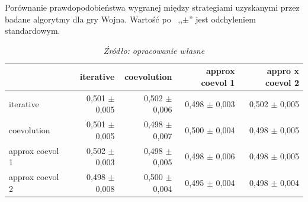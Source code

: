 \documentclass[inzynierska]{pwr_wmat_praca_dyplomowa}
\theoremstyle{plain}
\numberwithin{theorem}{chapter}
\theoremstyle{definition}
\numberwithin{theorem}{chapter}
\begin{document}
	\begin{table}
		\begin{center}
			\caption{Porównanie prawdopodobieństwa wygranej między strategiami uzyskanymi przez badane algorytmy dla gry Wojna. Wartość po  ,,$\pm$'' jest odchyleniem standardowym.}
			\small
			\begin{tabular}{lrrrr}
				\hline
				\toprule
				{} &        iterative &      coevolution &    approx coevol 1&  appro x coevol 2 \\
				\midrule
				iterative       &  0,501 $\pm$ 0,005 &  0,502 $\pm$ 0,006 &  0,498 $\pm$ 0,003 &  0,502 $\pm$ 0,005 \\
				coevolution     &  0,501 $\pm$ 0,005 &  0,498 $\pm$ 0,007 &    0,500 $\pm$ 0,004 &  0,498 $\pm$ 0,005 \\
				approx coevol 1&  0,502 $\pm$ 0,003 &  0,498 $\pm$ 0,005 &  0,498 $\pm$ 0,006 &  0,498 $\pm$ 0,005 \\
				approx coevol 2 &  0,498 $\pm$ 0,008 &    0,500 $\pm$ 0,004 &  0,495 $\pm$ 0,004 &  0,498 $\pm$ 0,004 \\
				\bottomrule
				\hline
			\end{tabular}
			\caption*{\textit{Źródło: opracowanie własne}}
			\label{table:war_results_all}
		\end{center}
	\end{table}
	
\end{document}

